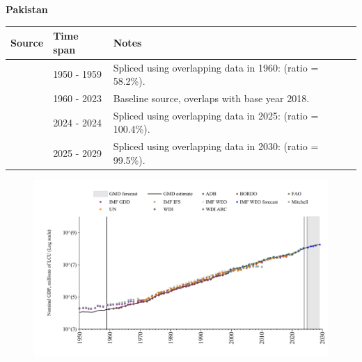 \documentclass[12pt,a4paper,landscape]{article}
\begin{document}
\begin{adjustbox}{max totalsize={\paperwidth}{\paperheight},center}
\begin{minipage}[t][\textheight][t]{\textwidth}
\vspace*{0.5cm}
{}
\begin{center}
{\Large\bfseries Pakistan}
\end{center}
\vspace{0.5cm}
\begin{table}[H]
\centering
\small
\begin{tabular}{|l|l|l|}
\hline
\textbf{Source} & \textbf{Time span} & \textbf{Notes} \\
\hline
\rowcolor{white}\cite{IMF_GDD}& 1950 - 1959 &Spliced using overlapping data in 1960: (ratio = 58.2\%).\\
\rowcolor{lightgray}\cite{WDI}& 1960 - 2023 &Baseline source, overlaps with base year 2018.\\
\rowcolor{white}\cite{IMF_IFS}& 2024 - 2024 &Spliced using overlapping data in 2025: (ratio = 100.4\%).\\
\rowcolor{lightgray}\cite{IMF_WEO_forecast}& 2025 - 2029 &Spliced using overlapping data in 2030: (ratio = 99.5\%).\\
\hline
\end{tabular}
\end{table}
\begin{figure}[H]
\centering
\includegraphics[width=\textwidth,height=0.6\textheight,keepaspectratio]{graphs/PAK_nGDP.pdf}
\end{figure}
\end{minipage}
\end{adjustbox}
\end{document}
